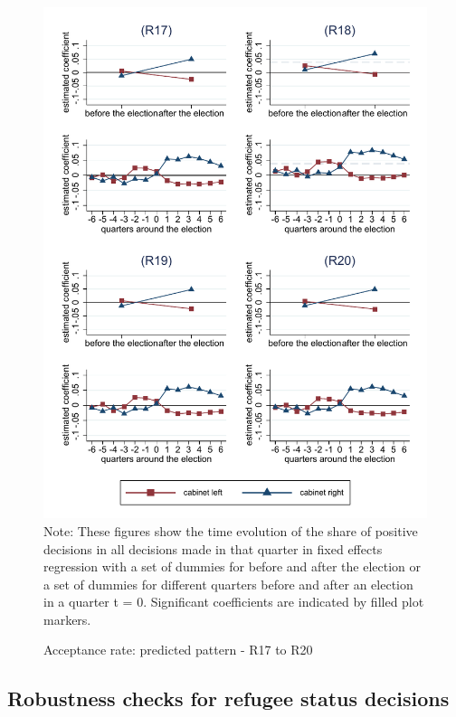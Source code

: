 \documentclass[11pt,a4paper]{scrartcl}
\begin{document}
\clearpage
\FloatBarrier
\begin{figure}[!ht]
	\caption{Acceptance rate: predicted pattern - R17 to R20}
	\includegraphics[width=1\textwidth]{../results/decisions/acceptance_rate_graphs_R17-R20.pdf}
	\scriptsize{Note: These figures show the time evolution of the share of positive decisions in all decisions made in that quarter in fixed effects regression with a set of dummies for before and after the election or a set of dummies for different quarters before and after an election in a quarter t = 0. Significant coefficients are indicated by filled plot markers.}
\end{figure}



\clearpage
\FloatBarrier
\subsection{Robustness checks for refugee status decisions}
\end{document}
